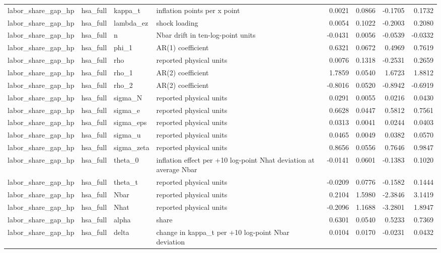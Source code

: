 \begin{tabular}{llllrrrr}
labor\_share\_gap\_hp & hsa\_full & kappa\_t & inflation points per x point & 0.0021 & 0.0866 & -0.1705 & 0.1732 \\
labor\_share\_gap\_hp & hsa\_full & lambda\_ez & shock loading & 0.0054 & 0.1022 & -0.2003 & 0.2080 \\
labor\_share\_gap\_hp & hsa\_full & n & Nbar drift in ten-log-point units & -0.0431 & 0.0056 & -0.0539 & -0.0332 \\
labor\_share\_gap\_hp & hsa\_full & phi\_1 & AR(1) coefficient & 0.6321 & 0.0672 & 0.4969 & 0.7619 \\
labor\_share\_gap\_hp & hsa\_full & rho & reported physical units & 0.0076 & 0.1318 & -0.2531 & 0.2659 \\
labor\_share\_gap\_hp & hsa\_full & rho\_1 & AR(2) coefficient & 1.7859 & 0.0540 & 1.6723 & 1.8812 \\
labor\_share\_gap\_hp & hsa\_full & rho\_2 & AR(2) coefficient & -0.8016 & 0.0520 & -0.8942 & -0.6919 \\
labor\_share\_gap\_hp & hsa\_full & sigma\_N & reported physical units & 0.0291 & 0.0055 & 0.0216 & 0.0430 \\
labor\_share\_gap\_hp & hsa\_full & sigma\_e & reported physical units & 0.6628 & 0.0447 & 0.5812 & 0.7561 \\
labor\_share\_gap\_hp & hsa\_full & sigma\_eps & reported physical units & 0.0313 & 0.0041 & 0.0244 & 0.0403 \\
labor\_share\_gap\_hp & hsa\_full & sigma\_u & reported physical units & 0.0465 & 0.0049 & 0.0382 & 0.0570 \\
labor\_share\_gap\_hp & hsa\_full & sigma\_zeta & reported physical units & 0.8656 & 0.0556 & 0.7646 & 0.9847 \\
labor\_share\_gap\_hp & hsa\_full & theta\_0 & inflation effect per +10 log-point Nhat deviation at average Nbar & -0.0141 & 0.0601 & -0.1383 & 0.1020 \\
labor\_share\_gap\_hp & hsa\_full & theta\_t & reported physical units & -0.0209 & 0.0776 & -0.1582 & 0.1444 \\
labor\_share\_gap\_hp & hsa\_full & Nbar & reported physical units & 0.2104 & 1.5980 & -2.3846 & 3.1419 \\
labor\_share\_gap\_hp & hsa\_full & Nhat & reported physical units & -0.2096 & 1.1688 & -3.2801 & 1.8947 \\
labor\_share\_gap\_hp & hsa\_full & alpha & share & 0.6301 & 0.0540 & 0.5233 & 0.7369 \\
labor\_share\_gap\_hp & hsa\_full & delta & change in kappa\_t per +10 log-point Nbar deviation & 0.0104 & 0.0170 & -0.0231 & 0.0432 \\

\end{tabular}

